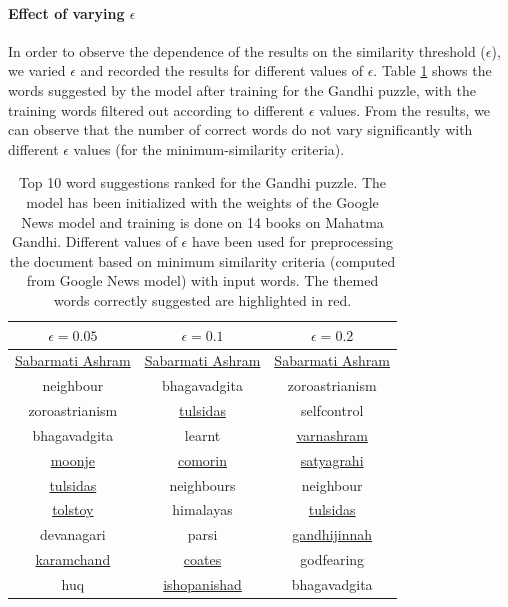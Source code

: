 \documentclass[twoside]{article}
\begin{document}
\paragraph{Effect of varying $\epsilon$}{
In order to observe the dependence of the results on the similarity threshold ($\epsilon$), we varied $\epsilon$ and recorded the results for different values of $\epsilon$. Table \ref{tab:table11} shows the words suggested by the model after training for the Gandhi puzzle, with the training words filtered out according to different $\epsilon$ values. From the results, we can observe that the number of correct words do not vary significantly with different $\epsilon$ values (for the minimum-similarity criteria).}

\begin{table}[h!]
  \begin{center}
    \begin{tabular}{c c c}
      \toprule
      \textbf{$\epsilon=0.05$} & \textbf{$\epsilon=0.1$} & \textbf{$\epsilon=0.2$} \\ 
      \midrule
      \ul{Sabarmati Ashram} & \ul{Sabarmati Ashram} & \ul{Sabarmati Ashram} \\
      neighbour & bhagavadgita & zoroastrianism\\
      zoroastrianism & \ul{tulsidas} & selfcontrol\\
      bhagavadgita & learnt & \ul{varnashram}\\
      \ul{moonje} & \ul{comorin} & \ul{satyagrahi} \\
      \ul{tulsidas} & neighbours & neighbour \\
      \ul{tolstoy} & himalayas & \ul{tulsidas}\\
      devanagari & parsi & \ul{gandhijinnah}\\
      \ul{karamchand} & \ul{coates} & godfearing \\
      huq & \ul{ishopanishad} & bhagavadgita \\
      \bottomrule
    \end{tabular}
    \caption{Top 10 word suggestions ranked for the Gandhi puzzle. The model has been initialized with the weights of the Google News model and training is done on 14 books on Mahatma Gandhi. Different values of $\epsilon$ have been used for preprocessing the document based on minimum similarity criteria (computed from Google News model) with input words. The themed words correctly suggested are highlighted in red.}
    \label{tab:table11}
  \end{center}
\end{table} 
\end{document}
